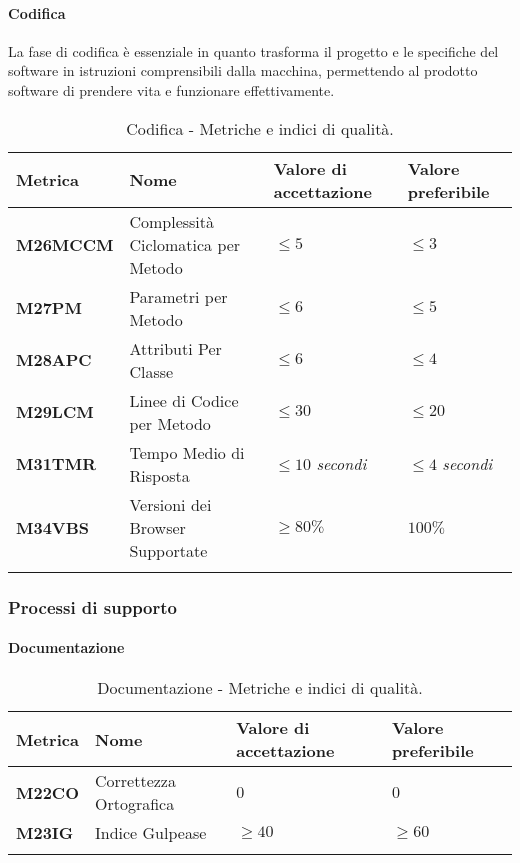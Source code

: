 \paragraph{Codifica}
La fase di codifica è essenziale in quanto trasforma il progetto e le specifiche del software in istruzioni comprensibili dalla macchina, permettendo al prodotto software di prendere vita e funzionare effettivamente.

\hspace{1pt}
    \begin{longtable}{|C{1.8cm}|L{3cm}|L{2.5cm}|L{2.5cm}|}
        \hline
        \textbf{Metrica} & \textbf{Nome} & \textbf{Valore di accettazione} & \textbf{Valore preferibile} \\
        \hline
        \textbf{M26MCCM} & Complessità Ciclomatica per Metodo & $\leq 5$ & $\leq 3$ \\
        \hline
        \textbf{M27PM} & Parametri per Metodo & $\leq 6$ & $\leq 5$ \\
        \hline
        \textbf{M28APC} & Attributi Per Classe & $\leq 6$ & $\leq 4$ \\
        \hline
        \textbf{M29LCM} & Linee di Codice per Metodo & $\leq 30$ & $\leq 20$ \\
        \hline
        \textbf{M31TMR} & Tempo Medio di Risposta & $\leq 10$ \textit{secondi}  & $\leq 4$ \textit{secondi} \\
        \hline
        \textbf{M34VBS} & Versioni dei Browser Supportate & $\geq 80\%$ & $100\%$ \\
        \hline
    \caption{Codifica - Metriche e indici di qualità.}
    \label{tab:metriche}
\end{longtable}




\subsubsection{Processi di supporto}

\paragraph{Documentazione}
\hspace{1pt}
    \begin{longtable}{|C{1.5cm}|L{3cm}|L{2.5cm}|L{2.5cm}|}
        \hline
        \textbf{Metrica} & \textbf{Nome} & \textbf{Valore di accettazione} & \textbf{Valore preferibile} \\
        \hline
        \textbf{M22CO} & Correttezza Ortografica & $0$ & $0$ \\
        \hline
        \textbf{M23IG} & Indice Gulpease & $\geq 40$ & $\geq 60$ \\
        \hline
    \caption{Documentazione - Metriche e indici di qualità.}
    \label{tab:metriche_testo}
\end{longtable}

